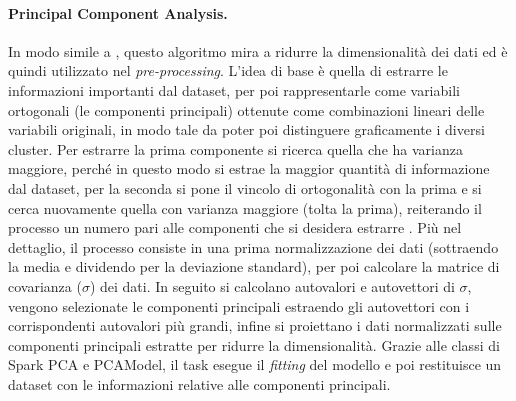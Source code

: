 \documentclass[12pt,a4paper,fleqn,titlepage]{report}
\begin{document}
        \paragraph{Principal Component Analysis.}
        In modo simile a , questo algoritmo mira a ridurre la dimensionalità dei dati ed è quindi utilizzato nel \emph{pre-processing}. L'idea di base è quella di estrarre le informazioni importanti dal dataset, per poi rappresentarle come variabili ortogonali (le componenti principali) ottenute come combinazioni lineari delle variabili originali, in modo tale da poter poi distinguere graficamente i diversi cluster.
        Per estrarre la prima componente si ricerca quella che ha varianza maggiore, perché in questo modo si estrae la maggior quantità di informazione dal dataset, per la seconda si pone il vincolo di ortogonalità con la prima e si cerca nuovamente quella con varianza maggiore (tolta la prima), reiterando il processo un numero pari alle componenti che si desidera estrarre \cite{abdi:2010}.
        Più nel dettaglio, il processo consiste in una prima normalizzazione dei dati (sottraendo la media e dividendo per la deviazione standard), per poi calcolare la matrice di covarianza ($\sigma$) dei dati. In seguito si calcolano autovalori e autovettori di $\sigma$, vengono selezionate le componenti principali estraendo gli autovettori con i corrispondenti autovalori più grandi, infine si proiettano i dati normalizzati sulle componenti principali estratte per ridurre la dimensionalità.
        Grazie alle classi di Spark PCA e PCAModel, il task esegue il \emph{fitting} del modello e poi restituisce un dataset con le informazioni relative alle componenti principali.
\end{document}

